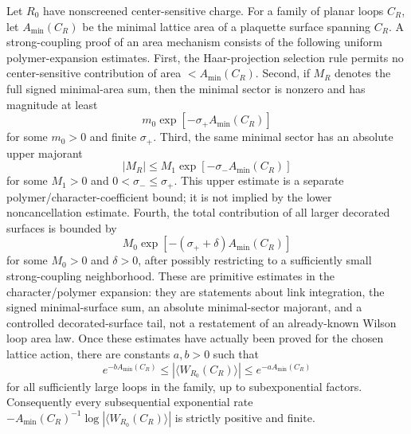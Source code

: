 \begin{controlledapproximation}
\label{ca:lattice-strong-coupling-area-law}
\leavevmode\par\noindent
Let \(R_0\) have nonscreened center-sensitive charge.  For a family of
planar loops \(C_R\), let \(A_{\min}(C_R)\) be the minimal lattice area of a
plaquette surface spanning \(C_R\).  A strong-coupling proof of an area
mechanism consists of the following uniform polymer-expansion estimates.
First, the Haar-projection selection rule permits no center-sensitive
contribution of area \(<A_{\min}(C_R)\).  Second, if \(M_R\) denotes the full
signed minimal-area sum, then the minimal sector is nonzero and has magnitude at
least
\[
  m_0\exp[-\sigma_+ A_{\min}(C_R)]
\]
for some \(m_0>0\) and finite \(\sigma_+\).  Third, the same minimal sector has
an absolute upper majorant
\[
  |M_R|
  \le
  M_1\exp[-\sigma_- A_{\min}(C_R)]
\]
for some \(M_1>0\) and \(0<\sigma_-\le \sigma_+\).  This upper estimate is a
separate polymer/character-coefficient bound; it is not implied by the lower
noncancellation estimate.  Fourth, the total contribution of all larger
decorated surfaces is bounded by
\[
  M_0\exp[-(\sigma_++\delta)A_{\min}(C_R)]
\]
for some \(M_0>0\) and \(\delta>0\), after possibly restricting to a
sufficiently small strong-coupling neighborhood.
These are primitive estimates in the character/polymer expansion: they are
statements about link integration, the signed minimal-surface sum, an absolute
minimal-sector majorant, and a controlled decorated-surface tail, not a
restatement of an already-known Wilson loop area law.
Once these estimates have actually been proved for the chosen lattice action,
there are constants \(a,b>0\) such that
\[
  e^{-b A_{\min}(C_R)}
  \le
  |\langle W_{R_0}(C_R)\rangle|
  \le
  e^{-a A_{\min}(C_R)}
\]
for all sufficiently large loops in the family, up to subexponential factors.
Consequently every subsequential exponential rate
\(-A_{\min}(C_R)^{-1}\log |\langle W_{R_0}(C_R)\rangle|\) is strictly
positive and finite.


\end{controlledapproximation}
